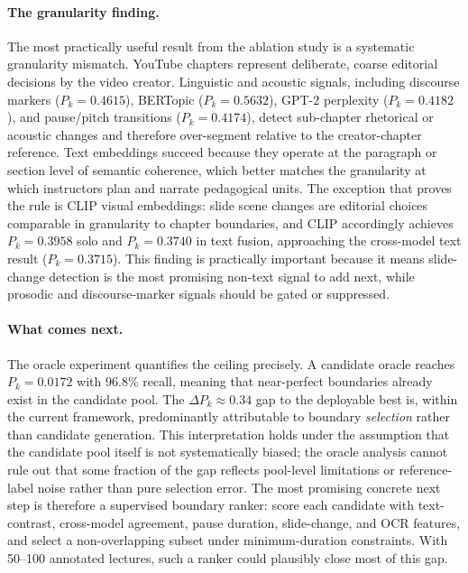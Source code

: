 \paragraph{The granularity finding.}
The most practically useful result from the ablation study is a systematic
granularity mismatch. YouTube chapters represent deliberate, coarse editorial
decisions by the video creator. Linguistic and acoustic signals,
including discourse markers ($P_k=0.4615$), BERTopic ($P_k=0.5632$), GPT-2
perplexity ($P_k=0.4182$), and pause/pitch transitions ($P_k=0.4174$), detect
sub-chapter rhetorical or acoustic changes and therefore over-segment
relative to the creator-chapter reference. Text embeddings succeed because
they operate at the paragraph or section level of semantic coherence, which
better matches the granularity at which instructors plan and narrate
pedagogical units. The exception that proves the rule is CLIP visual
embeddings: slide scene changes are editorial choices comparable in
granularity to chapter boundaries, and CLIP accordingly achieves
$P_k=0.3958$ solo and $P_k=0.3740$ in text fusion, approaching the
cross-model text result ($P_k=0.3715$). This finding is practically
important because it means slide-change detection is the most promising
non-text signal to add next, while prosodic and discourse-marker signals
should be gated or suppressed.

\paragraph{What comes next.}
The oracle experiment quantifies the ceiling precisely. A candidate oracle
reaches $P_k=0.0172$ with 96.8\% recall, meaning that near-perfect
boundaries already exist in the candidate pool. The $\Delta
P_k\approx0.34$ gap to the deployable best is, within the current framework,
predominantly attributable to boundary \emph{selection} rather than
candidate generation. This interpretation holds under the assumption that the
candidate pool itself is not systematically biased; the oracle analysis
cannot rule out that some fraction of the gap reflects pool-level
limitations or reference-label noise rather than pure selection error.
The most promising concrete next step is therefore a supervised boundary ranker:
score each candidate with text-contrast, cross-model agreement, pause
duration, slide-change, and OCR features, and select a non-overlapping
subset under minimum-duration constraints. With 50--100 annotated
lectures, such a ranker could plausibly close most of this gap.

